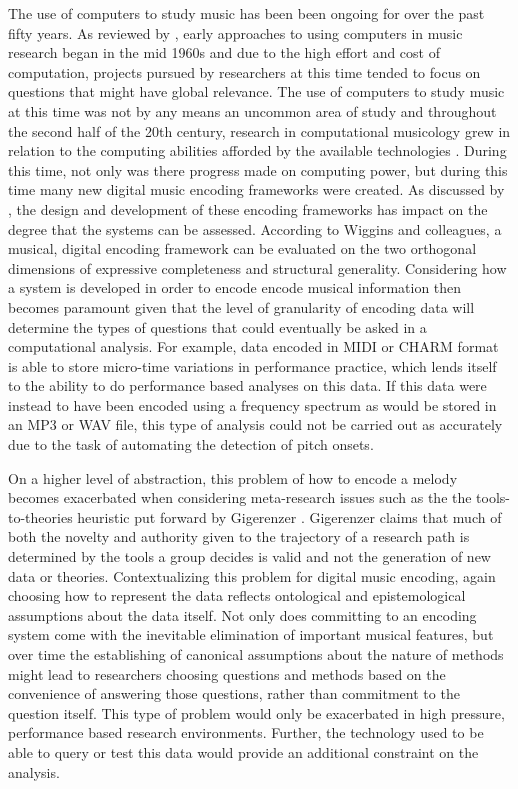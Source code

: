\documentclass[12pt,]{book}
\begin{document}
The use of computers to study music has been been ongoing for over the past fifty years.
As reviewed by \citet{hewlettComputingMusicology1991}, early approaches to using computers in music research began in the mid 1960s and due to the high effort and cost of computation, projects pursued by researchers at this time tended to focus on questions that might have global relevance.
The use of computers to study music at this time was not by any means an uncommon area of study and throughout the second half of the 20th century, research in computational musicology grew in relation to the computing abilities afforded by the available technologies \citep{nettheimBibliographyStatisticalApplications1997}.
During this time, not only was there progress made on computing power, but during this time many new digital music encoding frameworks were created.
As discussed by \citet{wigginsFrameworkEvaluationMusic1993}, the design and development of these encoding frameworks has impact on the degree that the systems can be assessed.
According to Wiggins and colleagues, a musical, digital encoding framework can be evaluated on the two orthogonal dimensions of expressive completeness and structural generality.
Considering how a system is developed in order to encode encode musical information then becomes paramount given that the level of granularity of encoding data will determine the types of questions that could eventually be asked in a computational analysis.
For example, data encoded in MIDI or CHARM format is able to store micro-time variations in performance practice, which lends itself to the ability to do performance based analyses on this data.
If this data were instead to have been encoded using a frequency spectrum as would be stored in an MP3 or WAV file, this type of analysis could not be carried out as accurately due to the task of automating the detection of pitch onsets.

On a higher level of abstraction, this problem of how to encode a melody becomes exacerbated when considering meta-research issues such as the the tools-to-theories heuristic put forward by Gigerenzer \citep{gigerenzerToolsTheoriesHeuristic1991}.
Gigerenzer claims that much of both the novelty and authority given to the trajectory of a research path is determined by the tools a group decides is valid and not the generation of new data or theories.
Contextualizing this problem for digital music encoding, again choosing how to represent the data reflects ontological and epistemological assumptions about the data itself.
Not only does committing to an encoding system come with the inevitable elimination of important musical features, but over time the establishing of canonical assumptions about the nature of methods might lead to researchers choosing questions and methods based on the convenience of answering those questions, rather than commitment to the question itself.
This type of problem would only be exacerbated in high pressure, performance based research environments.
Further, the technology used to be able to query or test this data would provide an additional constraint on the analysis.
\end{document}
